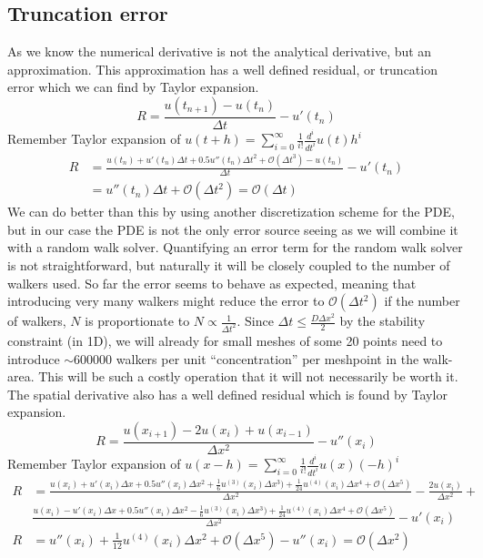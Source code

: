 \subsection{Truncation error}\label{truncation_error}

As we know the numerical derivative is not the analytical derivative, but an approximation. 
This approximation has a well defined residual, or truncation error which we can find by Taylor expansion.
\begin{equation*}
  R = \frac{u(t_{n+1}) -u(t_n)}{\Delta t} -u'(t_n)
\end{equation*}
Remember Taylor expansion of $u(t+h) = \sum\limits_{i=0}^\infty\frac{1}{i!}\frac{d^i}{dt^i}u(t)h^i$
\begin{align*}
 R &= \frac{u(t_n)+u'(t_n)\Delta t +0.5u''(t_n)\Delta t^2 + \mathcal{O}(\Delta t^3)-u(t_n)}{\Delta t} -u'(t_n)\\
  &= u''(t_n)\Delta t+ \mathcal{O}(\Delta t^2) = \mathcal{O}(\Delta t)
\end{align*}
We can do better than this by using another discretization scheme for the PDE, but in our case the PDE is not the only error source seeing as we will combine it with a random walk solver. 
Quantifying an error term for the random walk solver is not straightforward, but naturally it will be closely coupled to the number of walkers used. 
So far the error seems to behave as expected, meaning that introducing very many walkers might reduce the error to $\mathcal{O}(\Delta t^2)$ if the number of walkers, $N$ is proportionate to $N\propto\frac{1}{\Delta t^2}$. 
Since $\Delta t \leq\frac{D\Delta x^2}{2}$ by the stability constraint (in 1D), we will already for small meshes of some 20 points need to introduce $\sim600000$ walkers per unit ``concentration'' per meshpoint in the walk-area. 
This will be such a costly operation that it will not necessarily be worth it.\\
The spatial derivative also has a well defined residual which is found by Taylor expansion.
\begin{equation}
R = \frac{u(x_{i+1})-2u(x_i)+u(x_{i-1})}{\Delta x^2}-u''(x_i) 
\end{equation}
Remember Taylor expansion of $u(x-h) = \sum\limits_{i=0}^\infty\frac{1}{i!}\frac{d^i}{dt^i}u(x)(-h)^i$
\begin{align*}
 R &= \frac{u(x_i)+u'(x_i)\Delta x +0.5u''(x_i)\Delta x^2 + \frac{1}{6}u^{(3)}(x_i)\Delta x^3) +\frac{1}{24}u^{(4)}(x_i)\Delta x^4 +\mathcal{O}(\Delta x^5)}{\Delta x^2}-\frac{2u(x_i)}{\Delta x^2}+\\
 &\frac{u(x_i)-u'(x_i)\Delta x +0.5u''(x_i)\Delta x^2 - \frac{1}{6}u^{(3)}(x_i)\Delta x^3) +\frac{1}{24}u^{(4)}(x_i)\Delta x^4 +\mathcal{O}(\Delta x^5)}{\Delta x^2} -u'(x_i)\\
R &= u''(x_i) +\frac{1}{12}u^{(4)}(x_i)\Delta x^2 + \mathcal{O}(\Delta x^5)  -u''(x_i) = \mathcal{O}(\Delta x^2) 
\end{align*}

